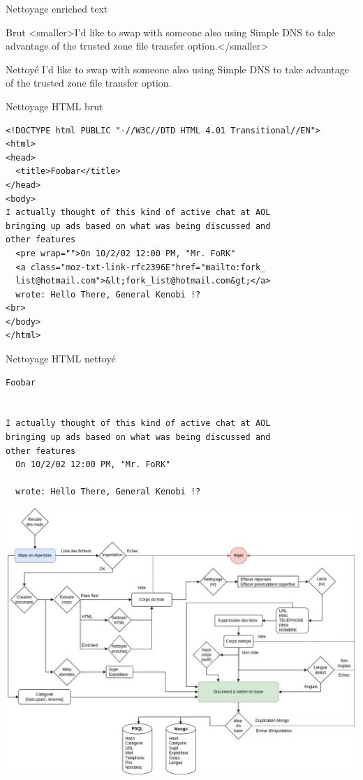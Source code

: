 \documentclass[xelatex,11pt, xcolor=dvipsnames]{beamer}
\begin{document}
\begin{frame}{Nettoyage enriched text}

	\begin{block}{Brut}
	<smaller>I'd like to swap with someone also using Simple DNS to take
advantage of the trusted zone file transfer option.</smaller>
	\end{block}
	
	\begin{block}{Nettoyé}
	I'd like to swap with someone also using Simple DNS to take
advantage of the trusted zone file transfer option.
	\end{block}
	
\end{frame}

\begin{frame}[fragile]{Nettoyage HTML brut}
\small
\begin{verbatim}
<!DOCTYPE html PUBLIC "-//W3C//DTD HTML 4.01 Transitional//EN">
<html>
<head>
  <title>Foobar</title>
</head>
<body>
I actually thought of this kind of active chat at AOL 
bringing up ads based on what was being discussed and 
other features
  <pre wrap="">On 10/2/02 12:00 PM, "Mr. FoRK" 
  <a class="moz-txt-link-rfc2396E"href="mailto:fork_
  list@hotmail.com">&lt;fork_list@hotmail.com&gt;</a> 
  wrote: Hello There, General Kenobi !?
<br>
</body>
</html>
\end{verbatim}
\normalsize
	
\end{frame}

\begin{frame}[fragile]{Nettoyage HTML nettoyé}
\small
\begin{verbatim}
Foobar


I actually thought of this kind of active chat at AOL 
bringing up ads based on what was being discussed and 
other features
  On 10/2/02 12:00 PM, "Mr. FoRK" 
   
  wrote: Hello There, General Kenobi !?
\end{verbatim}
\normalsize
\end{frame}

\begin{frame}
	\includegraphics[width=\linewidth]{img/SchemaPhase1}
\end{frame}
\end{document}

